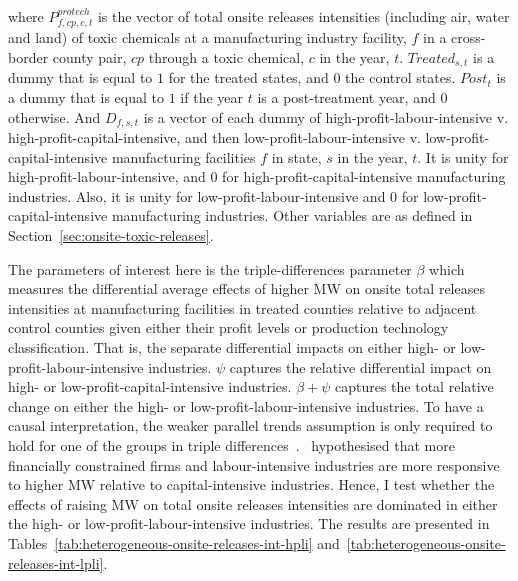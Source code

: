 \documentclass[authoryear, preprint, twocolumn, 1p]{elsarticle}
\begin{document}
    where $P_{f,cp,c,t}^{protech}$ is the vector of total onsite releases intensities (including air, water and land) of toxic chemicals at a manufacturing industry facility, $f$ in a cross-border county pair, $cp$ through a toxic chemical, $c$ in the year, $t$. $Treated_{s,t}$ is a dummy that is equal to $1$ for the treated states, and $0$ the control states. $Post_{t}$ is a dummy that is equal to $1$ if the year $t$ is a post-treatment year, and $0$ otherwise. And $D_{f,s,t}$ is a vector of each dummy of high-profit-labour-intensive v. high-profit-capital-intensive, and then low-profit-labour-intensive v. low-profit-capital-intensive manufacturing facilities $f$ in state, $s$ in the year, $t$. It is unity for high-profit-labour-intensive, and $0$ for high-profit-capital-intensive manufacturing industries. Also, it is unity for low-profit-labour-intensive and $0$ for low-profit-capital-intensive manufacturing industries. Other variables are as defined in Section~\ref{sec:onsite-toxic-releases}.

    The parameters of interest here is the triple-differences parameter $\beta$ which measures the differential average effects of higher MW on onsite total releases intensities at manufacturing facilities in treated counties relative to adjacent control counties given either their profit levels or production technology classification. That is, the separate differential impacts on either high- or low-profit-labour-intensive industries. $\psi$ captures the relative differential impact on high- or low-profit-capital-intensive industries. $\beta + \psi$ captures the total relative change on either the high- or low-profit-labour-intensive industries. To have a causal interpretation, the weaker parallel trends assumption is only required to hold for one of the groups in triple differences~\citep{olden2022triple}.~\citet{zhang2023unintended} hypothesised that more financially constrained firms and labour-intensive industries are more responsive to higher MW relative to capital-intensive industries. Hence, I test whether the effects of raising MW on total onsite releases intensities are dominated in either the high- or low-profit-labour-intensive industries. The results are presented in Tables~\ref{tab:heterogeneous-onsite-releases-int-hpli} and~\ref{tab:heterogeneous-onsite-releases-int-lpli}.
\end{document}
